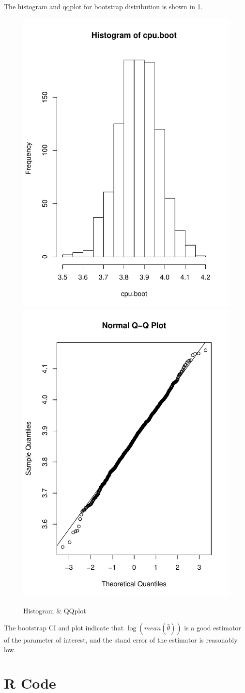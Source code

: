 \documentclass[11pt,letterpaper,titlepage,en-US]{article}
\begin{document}
The histogram and qqplot for bootstrap distribution is shown in \cref{fi}.
\begin{figure}[H]
\includegraphics[width=.49\textwidth]{fig/hist.pdf}
\includegraphics[width=.49\textwidth]{fig/qqplot.pdf}
\caption{Histogram \& QQplot}\label{fi}
\end{figure}

The bootstrap CI and plot indicate that $\log(mean(\hat{\theta}))$ is a good 
estimator of the parameter of interest, and the stand error of the estimator is reasonably low.

\pagebreak

\section{R Code}


\end{document}
